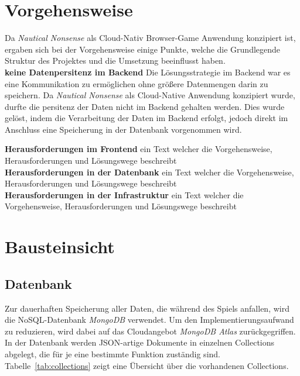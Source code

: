 \documentclass[a4paper, 10pt, conference]{IEEEtran}
\begin{document}
\section{Vorgehensweise}\label{sec:vorgehensweise}
Da \textit{Nautical Nonsense} als Cloud-Nativ Browser-Game Anwendung konzipiert ist, ergaben sich bei der Vorgehensweise einige Punkte, welche die Grundlegende Struktur des Projektes und die Umsetzung beeinflusst haben.\\

\textbf{keine Datenpersitenz im Backend} Die Lösungsstrategie im Backend war es eine Kommunikation zu ermöglichen ohne größere Datenmengen darin zu speichern. Da \textit{Nautical Nonsense} als Cloud-Native Anwendung konzipiert wurde, durfte die persitenz der Daten nicht im Backend gehalten werden. Dies wurde gelöst, indem die Verarbeitung der Daten im Backend erfolgt, jedoch direkt im Anschluss eine Speicherung in der Datenbank vorgenommen wird. 

\textbf{Herausforderungen im Frontend} 
ein Text welcher die Vorgehensweise, Herausforderungen und Lösungswege beschreibt\\
\textbf{Herausforderungen in der Datenbank} 
ein Text welcher die Vorgehensweise, Herausforderungen und Lösungswege beschreibt\\
\textbf{Herausforderungen in der Infrastruktur} 
ein Text welcher die Vorgehensweise, Herausforderungen und Lösungswege beschreibt\\

\section{Bausteinsicht}\label{sec:bausteinsicht}



\subsection{Datenbank}\label{subsec:datenbank}
Zur dauerhaften Speicherung aller Daten, die während des Spiels anfallen, wird die NoSQL-Datenbank \textit{MongoDB} verwendet. Um den Implementierungsaufwand zu reduzieren, wird dabei auf das Cloudangebot \textit{MongoDB Atlas} zurückgegriffen. In der Datenbank werden JSON-artige Dokumente in einzelnen Collections abgelegt, die für je eine bestimmte Funktion zuständig sind. Tabelle~\ref{tab:collections} zeigt eine Übersicht über die vorhandenen Collections.
\end{document}

